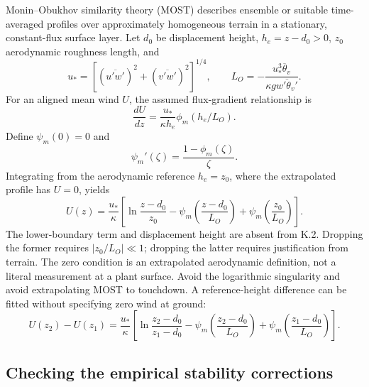 \documentclass[11pt,a4paper]{article}
\numberwithin{equation}{section}
\begin{document}
Monin--Obukhov similarity theory (MOST) describes ensemble or suitable
time-averaged profiles over approximately homogeneous terrain in a
stationary, constant-flux surface layer. Let $d_0$ be displacement height,
$h_e=z-d_0>0$, $z_0$ aerodynamic roughness length, and
\begin{equation}
 u_*=[(\overline{u'w'})^2+(\overline{v'w'})^2]^{1/4},\qquad
 L_O=-\frac{u_*^3\overline\theta_v}
            {\kappa g\overline{w'\theta_v'}}.
\end{equation}
For an aligned mean wind $U$, the assumed flux-gradient relationship is
\begin{equation}
 \frac{dU}{dz}=\frac{u_*}{\kappa h_e}\phi_m(h_e/L_O).
\end{equation}
Define $\psi_m(0)=0$ and
\begin{equation}
 \psi_m'(\zeta)=\frac{1-\phi_m(\zeta)}{\zeta}.
\end{equation}
Integrating from the aerodynamic reference $h_e=z_0$, where the
extrapolated profile has $U=0$, yields
\begin{equation}
 U(z)=\frac{u_*}{\kappa}
 \left[\ln\frac{z-d_0}{z_0}-\psi_m\left(\frac{z-d_0}{L_O}\right)
                         +\psi_m\left(\frac{z_0}{L_O}\right)\right].
\end{equation}
The lower-boundary term and displacement height are absent from K.2.
Dropping the former requires $|z_0/L_O|\ll1$; dropping the latter
requires justification from terrain. The zero condition is an extrapolated
aerodynamic definition, not a literal measurement at a plant surface.
Avoid the logarithmic singularity and avoid extrapolating MOST to touchdown.
A reference-height difference can be fitted without specifying zero wind
at ground:
\begin{equation}
 U(z_2)-U(z_1)=\frac{u_*}{\kappa}
 \left[\ln\frac{z_2-d_0}{z_1-d_0}
 -\psi_m\left(\frac{z_2-d_0}{L_O}\right)
 +\psi_m\left(\frac{z_1-d_0}{L_O}\right)\right].
\end{equation}

\subsection{Checking the empirical stability corrections}
\end{document}
